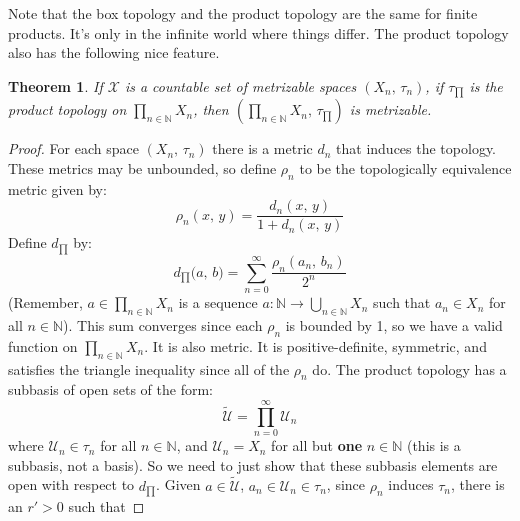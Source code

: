 \documentclass{article}
\theoremstyle{plain}
\newtheorem{theorem}{Theorem}[section]
\theoremstyle{normal}
\begin{document}
        Note that the box topology and the product topology are the same for
        finite products. It's only in the infinite world where things differ.
        The product topology also has the following nice feature.
        \begin{theorem}
            If $\mathcal{X}$ is a countable set of metrizable spaces
            $(X_{n},\,\tau_{n})$, if $\tau_{\prod}$ is the product topology
            on $\prod_{n\in\mathbb{N}}X_{n}$, then
            $(\prod_{n\in\mathbb{N}}X_{n},\,\tau_{\prod})$ is metrizable.
        \end{theorem}
        \begin{proof}
            For each space $(X_{n},\,\tau_{n})$ there is a metric $d_{n}$ that
            induces the topology. These metrics may be unbounded, so define
            $\rho_{n}$ to be the topologically equivalence metric given by:
            \begin{equation}
                \rho_{n}(x,\,y)=
                \frac{d_{n}(x,\,y)}{1+d_{n}(x,\,y)}
            \end{equation}
            Define $d_{\prod}$ by:
            \begin{equation}
                d_{\prod}\big(a,\,b)
                =\sum_{n=0}^{\infty}\frac{\rho_{n}(a_{n},\,b_{n})}{2^{n}}
            \end{equation}
            (Remember, $a\in\prod_{n\in\mathbb{N}}X_{n}$ is a sequence
            $a:\mathbb{N}\rightarrow\bigcup_{n\in\mathbb{N}}X_{n}$ such that
            $a_{n}\in{X}_{n}$ for all $n\in\mathbb{N}$). This sum converges
            since each $\rho_{n}$ is bounded by 1, so we have a valid function
            on $\prod_{n\in\mathbb{N}}X_{n}$. It is also metric. It is
            positive-definite, symmetric, and satisfies the triangle inequality
            since all of the $\rho_{n}$ do. The product topology has a subbasis
            of open sets of the form:
            \begin{equation}
                \tilde{\mathcal{U}}=\prod_{n=0}^{\infty}\mathcal{U}_{n}
            \end{equation}
            where $\mathcal{U}_{n}\in\tau_{n}$ for all $n\in\mathbb{N}$, and
            $\mathcal{U}_{n}=X_{n}$ for all but \textbf{one} $n\in\mathbb{N}$
            (this is a subbasis, not a basis). So we need to just show that
            these subbasis elements are open with respect to
            $d_{\prod}$. Given $a\in\tilde{\mathcal{U}}$,
            $a_{n}\in\mathcal{U}_{n}\in\tau_{n}$, since
            $\rho_{n}$ induces $\tau_{n}$, there is an $r'>0$ such that

\end{proof}
\end{document}
